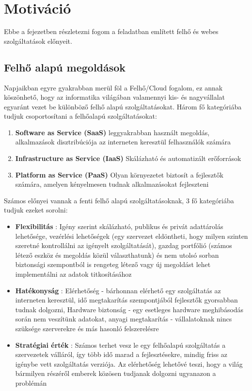 \section{Motiváció}

Ebbe a fejezetben részletezni fogom a feladatban említett felhő és webes szolgáltatások előnyeit.

\subsection{Felhő alapú megoldások}
Napjaikban egyre gyakrabban merül föl a Felhő/Cloud fogalom, ez annak köszönhető, hogy az informatika világában valamennyi kis- és nagyvállalat egyaránt vezet be különböző felhő alapú szolgáltatásokat. Három fő kategóriába tudjuk csoportosítani a felhőalapú szolgáltatásokat:

\begin{enumerate}
	\item \textbf{Software as Service (SaaS)} leggyakrabban használt megoldás, alkalmazások disztribúciója az interneten keresztül felhasználók számára
	\item \textbf{Infrastructure as Service (IaaS)}	Skálázható és automatizált erőforrások
	\item \textbf{Platform as Service (PaaS)} Olyan környezetet biztosít a fejlesztők számára, amelyen kényelmesen tudnak alkalmazásokat fejleszteni
\end{enumerate}

Számos előnyei vannak a fenti felhő alapú szolgáltatásoknak, 3 fő kategóriába tudjuk ezeket sorolni:

 \begin{itemize}
	\item \textbf{Flexibilitás} : Igény szerint skálázható, publikus és privát adattárolás lehetősége, vezérlési lehetőségek (egy szervezet eldöntheti, hogy milyen szinten szeretné kontrollálni az igényelt szolgáltatását), gazdag portfólió (számos létező eszköz és megoldás közül választhatunk) és nem utolsó sorban biztonsági szempontból is rengeteg létező vagy új megoldást lehet implementálni az adatok titkosításához
	\item \textbf{Hatékonyság} : Elérhetőség - bárhonnan elérhető egy szolgáltatás az interneten keresztül, idő megtakarítás szempontjából fejlesztők gyorsabban tudnak dolgozni, Hardware biztonság - egy esetleges hardware meghibásodás során nem veszítünk adatokat, anyagi megtakarítás - vállalatoknak nincs szüksége szerverekre és más hasonló felszerelésre
	\item \textbf{Stratégiai érték} : Számos terhet vesz le egy felhőalapú szolgáltatás a szervezetek válláról, így több idő marad a fejlesztésekre, mindig friss az igénybe vett szolgáltatás verziója. Az elérhetőség lehetővé teszi, hogy a világ bármilyen részéről emberek közösen tudjanak dolgozni ugyanazon a problémán
\end{itemize}

